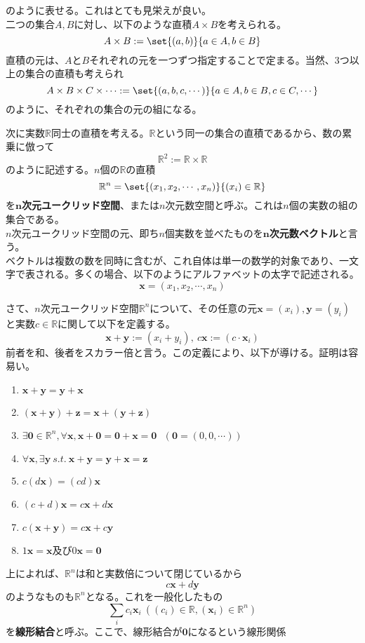 \documentclass[dvipdfmx]{jsarticle}
\begin{document}
のように表せる。これはとても見栄えが良い。\\
\build 二つの集合$A,B$に対し、以下のような直積$A \times B$を考えられる。
\[A \times B := \set{(a,b)}{a \in A, b \in B}\]
直積の元は、$A$と$B$それぞれの元を一つずつ指定することで定まる。当然、3つ以上の集合の直積も考えられ
\[A \times B \times C \times \cdots := \set{(a,b,c,\cdots)}{a \in A, b \in B, c \in C, \cdots}\]
のように、それぞれの集合の元の組になる。\par
次に実数$\mathbb{R}$同士の直積を考える。$\mathbb{R}$という同一の集合の直積であるから、数の累乗に倣って
\[\mathbb{R}^2:=\mathbb{R} \times \mathbb{R}\]
のように記述する。$n$個の$\mathbb{R}$の直積
\[\mathbb{R}^n = \set{(x_1,x_2,\cdots,x_n)}{(x_i) \in \mathbb{R}}\]
を$\bm{n}$\textbf{次元ユークリッド空間}、または$n$次元数空間と呼ぶ。これは$n$個の実数の組の集合である。\\
$n$次元ユークリッド空間の元、即ち$n$個実数を並べたものを$\bm{n}$\textbf{次元数ベクトル}と言う。\\
ベクトルは複数の数を同時に含むが、これ自体は単一の数学的対象であり、一文字で表される。多くの場合、以下のようにアルファベットの太字で記述される。
\[\bm{x}=(x_1,x_2,\cdots,x_n)\]\par
さて、$n$次元ユークリッド空間$\mathbb{R}^n$について、その任意の元$\bm{x}=(x_i),\bm{y}=(y_i)$と実数$c\in\mathbb{R}$に関して以下を定義する。
\[\bm{x}+\bm{y}:=(x_i+y_i),~c\bm{x}:=(c\cdot\bm{x}_i)\]
前者を和、後者をスカラー倍と言う。この定義により、以下が導ける。証明は容易い。
\begin{enumerate}
\item $\bm{x}+\bm{y}=\bm{y}+\bm{x}$
\item $(\bm{x}+\bm{y})+\bm{z}=\bm{x}+(\bm{y}+\bm{z})$
\item $\exists\bm{0}\in\mathbb{R}^n,\forall\bm{x},\bm{x}+\bm{0}=\bm{0}+\bm{x}=\bm{0}~~~(\bm{0}=(0,0,\cdots))$
\item $\forall\bm{x},\exists\bm{y}~s.t.~\bm{x}+\bm{y}=\bm{y}+\bm{x}=\bm{z}$
\item $c(d\bm{x})=(cd)\bm{x}$
\item $(c+d)\bm{x}=c\bm{x}+d\bm{x}$
\item $c(\bm{x}+\bm{y})=c\bm{x}+c\bm{y}$
\item $1\bm{x}=\bm{x}$及び$0\bm{x}=\bm{0}$
\end{enumerate}
上によれば、$\mathbb{R}^n$は和と実数倍について閉じているから
\[c\bm{x}+d\bm{y}\]
のようなものも$\mathbb{R}^n$となる。これを一般化したもの
\[\sum_ic_i\bm{x}_i~((c_i)\in\mathbb{R},(\bm{x}_i)\in\mathbb{R}^n)\]
を\textbf{線形結合}と呼ぶ。ここで、線形結合が$\bm{0}$になるという線形関係
\end{document}
